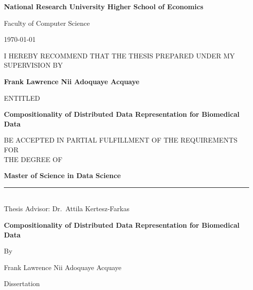 
\thispagestyle{empty}%


\begin{center}
{\bf\LARGE National Research University Higher School of Economics}

\par Faculty of Computer Science

\par\vspace{3mm}\hfill \today

\par\vspace{10mm}
I HEREBY RECOMMEND THAT THE THESIS PREPARED UNDER MY SUPERVISION BY

\par\vspace{2mm}
{\bf Frank Lawrence Nii Adoquaye Acquaye}

\par\vspace{5mm}
ENTITLED

{\bf\large Compositionality of Distributed Data Representation for Biomedical Data }

\par\vspace{5mm}
BE ACCEPTED IN PARTIAL FULFILLMENT OF THE REQUIREMENTS FOR\\ THE DEGREE OF

\par\vspace{5mm}
{\bf Master of Science in Data Science}
\end{center}

\vfill

\parbox[t]{50mm}{
\rule{50mm}{0.5pt}\\Thesis Advisor: Dr.~Attila Kertesz-Farkas
}

\newpage\thispagestyle{empty}%


\begin{center}
\vspace*{15mm}
\bf
{\Large Compositionality of Distributed Data Representation for Biomedical Data }

\par\vspace{8mm}
By 

\par\vspace{8mm}
Frank Lawrence Nii Adoquaye Acquaye

\par\vspace{50mm}
Dissertation
\end{center}

